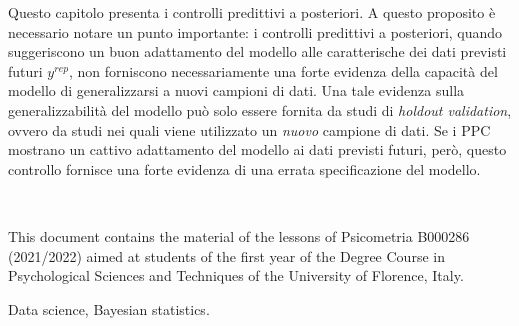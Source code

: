 \documentclass[
  10pt,
  italian,
  a4paper,
  extrafontsizes,onecolumn,openright
  ]{memoir}
\makeatletter
\newcommand{\MemoirChapStyle}{daleif1}
\newcommand{\MemoirPageStyle}{Ruled}
\newlength\widthw %
\newcommand*{\SmallMargins}{
  \setlrmarginsandblock{1.5in}{1.5in}{*}
  \setmarginnotes{0.1in}{0.1in}{0.1in}
 \setulmarginsandblock{1.5in}{1in}{*}
  \checkandfixthelayout
  \ch@ngetext
  \clearpage
  \setlength{\widthw}{\textwidth+\marginparsep+\marginparwidth}
  \footnotesatfoot
  \chapterstyle{\MemoirChapStyle}  %
  \pagestyle{\MemoirPageStyle}
}
\newcommand{\LargeMargins}{\SmallMargins}
\newcommand{\evenpage}{
  \clearpage
  \strictpagecheck %
  \checkoddpage
  \ifoddpage
    \thispagestyle{empty}
    ~\\ %
    \newpage
  \else
  \fi
}
\makeatother
\begin{document}
Questo capitolo presenta i controlli predittivi a posteriori. A questo proposito è necessario notare un punto importante: i controlli predittivi a posteriori, quando suggeriscono un buon adattamento del modello alle caratterische dei dati previsti futuri \(y^{rep}\), non forniscono necessariamente una forte evidenza della capacità del modello di generalizzarsi a nuovi campioni di dati. Una tale evidenza sulla generalizzabilità del modello può solo essere fornita da studi di \emph{holdout validation}, ovvero da studi nei quali viene utilizzato un \emph{nuovo} campione di dati. Se i PPC mostrano un cattivo adattamento del modello ai dati previsti futuri, però, questo controllo fornisce una forte evidenza di una errata specificazione del modello.



\backmatter
\SmallMargins

\printbibliography
\onecolumn




\cleardoublepage
\LargeMargins
\listoffigures







\evenpage
\SmallMargins
\thispagestyle{empty}

\begin{normalsize}

\begin{description}

\item[Abstract]
This document contains the material of the lessons of Psicometria B000286 (2021/2022) aimed at students of the first year of the Degree Course in Psychological Sciences and Techniques of the University of Florence, Italy.
\item[Keywords]
Data science, Bayesian statistics.
~\\

\end{description}

\end{normalsize}
\end{document}
